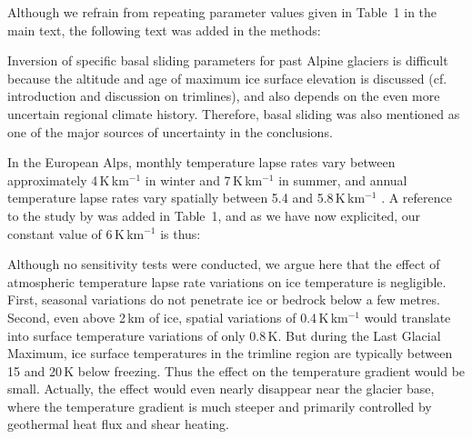     Although we refrain from repeating parameter values given in Table~1 in the
    main text, the following text was added in the methods:


    Inversion of specific basal sliding parameters for past Alpine glaciers
    is difficult because the altitude and age of maximum ice surface elevation
    is discussed (cf. introduction and discussion on trimlines), and also
    depends on the even more uncertain regional climate history.  Therefore,
    basal sliding was also mentioned as one of the major sources of
    uncertainty in the conclusions.

 

    In the European Alps, monthly temperature lapse rates vary between
    approximately 4\,K\,km$^{-1}$ in winter and 7\,K\,km$^{-1}$ in summer, and
    annual temperature lapse rates vary spatially between 5.4 and
    5.8\,K\,km$^{-1}$ \citep{Rolland.2003}. A reference to the study by
    \citet{Rolland.2003} was added in Table~1, and as we have now explicited,
    our constant value of 6\,K\,km$^{-1}$ is thus:


    Although no sensitivity tests were conducted, we argue here that the effect
    of atmospheric temperature lapse rate variations on ice temperature is
    negligible. First, seasonal variations do not penetrate ice or bedrock
    below a few metres. Second, even above 2\,km of ice, spatial variations of
    0.4\,K\,km$^{-1}$ would translate into surface temperature variations of
    only 0.8\,K. But during the Last Glacial Maximum, ice surface temperatures
    in the trimline region are typically between 15 and 20\,K below freezing.
    Thus the effect on the temperature gradient would be small.  Actually, the
    effect would even nearly disappear near the glacier base, where the
    temperature gradient is much steeper and primarily controlled by geothermal
    heat flux and shear heating.



